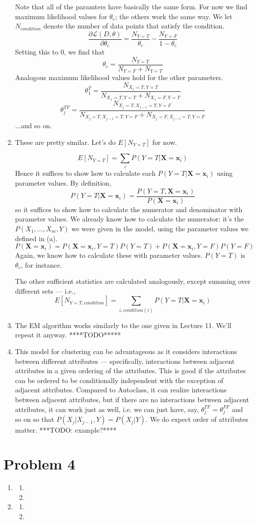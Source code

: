 \documentclass{article}
\newcommand{\dee}[2]{\frac{\partial{#1}}{\partial{#2}}}
\begin{document}
\begin{enumerate}
  Note that all of the paramters have basically the same form. For now
  we find maximum likelihood values for $\theta_c$; the others work the
  same way.  We let $N_{condition}$ denote the number of data points
  that satisfy the condition.
  $$\dee{\mathcal
    L(D,\theta)}{\theta_c}=\frac{N_{Y=T}}{\theta_c}-\frac{N_{Y=F}}{1-\theta_c}$$
  Setting this to 0, we find that
  $$\theta_c=\frac{N_{Y=T}}{N_{Y=F}+N_{Y=T}}$$
  Analogous maximum likelihood values hold for the other parameters. 
  $$\theta_1^T=\frac{N_{X_1=T,Y=T}}{N_{X_1=T,Y=T}+N_{X_1=F,Y=T}}$$
  $$\theta_j^{TF}=\frac{N_{X_j=T,X_{j-1}=T,Y=F}}{N_{X_j=T,X_{j-1}=T,Y=F}+N_{X_j=F,X_{j-1}=T,Y=F}}$$
  ...and so on. 
\item These are pretty similar. Let's do $E[N_{Y=T}]$ for now. 

  $$E[N_{Y=T}]=\sum_i P(Y=T|\mathbf X = \mathbf x_i)$$ Hence it
  suffices to show how to calculate each $P(Y=T|\mathbf X=\mathbf
  x_i)$ using parameter values.  By definition,
  $$P(Y=T|\mathbf X = \mathbf x_i)=\frac{P(Y=T, \mathbf X = \mathbf x_i)}{P(\mathbf X = \mathbf x_i)}$$
  so it suffices to show how to calculate the numerator and denominator with
  parameter values. We already know how to calculate the numerator: it's the 
  $P(X_1,\ldots,X_m,Y)$ we were given in the model, using the parameter values
  we defined in (a). 
  $$P(\mathbf X = \mathbf x_i)=P(\mathbf X = \mathbf x_i,
  Y=T)P(Y=T)+P(\mathbf X = \mathbf x_i, Y=F)P(Y=F)$$ Again, we know
  how to calculate these with parameter values. $P(Y=T)$ is
  $\theta_c$, for instance.

  The other sufficient statistics are calculated analogously, except
  summing over different sets --- i.e.,
  $$E[N_{Y=T,condition}]=\sum_{i, condition(i)} P(Y=T|\mathbf X=\mathbf x_i)$$

\item The EM algorithm works similarly to the one given in Lecture 11. We'll repeat it anyway. 
  ****TODO*****
  
\item This model for clustering can be advantageous as it considers
  interactions between different attributes --- specifically,
  interactions between adjacent attributes in a given ordering of the
  attributes. This is good if the attributes can be ordered to be
  conditionally independent with the exception of adjacent
  attributes. Compared to Autoclass, it can realize interactions
  between adjacent attributes, but if there are no interactions
  between adjacent attributes, it can work just as well, i.e. we can
  just have, say, $\theta_j^{TF}=\theta_j^{FF}$ and so on so that
  $P(X_j|X_{j-1},Y)=P(X_j|Y)$.  We do expect order of attributes
  matter. ***TODO: example?****
\end{enumerate}
\section*{Problem 4}
\begin{enumerate}
\item 
  \begin{enumerate}
  \item 
  \item 
  \end{enumerate}
\item 
  \begin{enumerate}
  \item 
  \item 
  \end{enumerate}
\end{enumerate}
\end{document}
